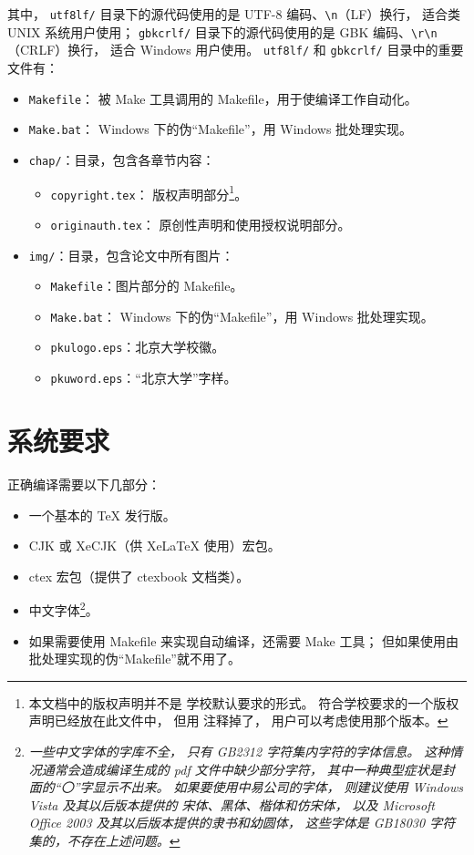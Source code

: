 	其中，%
	\verb|utf8lf/| 目录下的源代码使用的是 UTF-8 编码、\verb|\n|（LF）换行，
	适合类 UNIX 系统用户使用；%
	\verb|gbkcrlf/| 目录下的源代码使用的是 GBK 编码、\verb|\r\n|（CRLF）换行，
	适合 Windows 用户使用。%
	\verb|utf8lf/| 和 \verb|gbkcrlf/| 目录中的重要文件有：
	\begin{itemize}
		\item \verb|Makefile|：
			被 Make 工具调用的 Makefile，用于使编译工作自动化。
		\item \verb|Make.bat|：%
			Windows 下的伪“Makefile”，用 Windows 批处理实现。
		\item \verb|chap/|：目录，包含各章节内容：
		\begin{itemize}
			\item \verb|copyright.tex|：
				版权声明部分\footnote{%
					本文档中的版权声明并不是%
					学校默认要求的形式\cite{pku-copyright}。
					符合学校要求的一个版权声明已经放在此文件中，
					但用 \texttt{\string\iffalse{} ...\ \string\fi} %
					注释掉了，
					用户可以考虑使用那个版本。
				}。
			\item \verb|originauth.tex|：
				原创性声明和使用授权说明部分\cite{pku-originauth}。
		\end{itemize}
		\item \verb|img/|：目录，包含论文中所有图片：
		\begin{itemize}
			\item \verb|Makefile|：图片部分的 Makefile。
			\item \verb|Make.bat|：%
				Windows 下的伪“Makefile”，用 Windows 批处理实现。
			\item \verb|pkulogo.eps|：北京大学校徽。
			\item \verb|pkuword.eps|：“北京大学”字样。
		\end{itemize}
	\end{itemize}

	\section{系统要求}

	正确编译需要以下几部分：
	\begin{itemize}
		\item 一个基本的 \TeX{} 发行版。
		\item CJK 或 XeCJK（供 Xe\LaTeX{} 使用）宏包。
		\item ctex 宏包\cite{ctex,ctex-faq}（提供了 ctexbook 文档类）。
		\item 中文字体\footnote{\emph{%
			一些中文字体的字库不全，
			只有 GB2312 字符集内字符的字体信息。
			这种情况通常会造成编译生成的 pdf 文件中缺少部分字符，
			其中一种典型症状是封面的“〇”字显示不出来。
			如果要使用中易公司的字体，
			则建议使用 Windows Vista 及其以后版本提供的%
			宋体、黑体、楷体和仿宋体，
			以及 Microsoft Office 2003 及其以后版本提供的隶书和幼圆体，
			这些字体是 GB18030 字符集的，不存在上述问题。%
		}}。
		\item 如果需要使用 Makefile 来实现自动编译，还需要 Make 工具；
			但如果使用由批处理实现的伪“Makefile”就不用了。
	\end{itemize}

